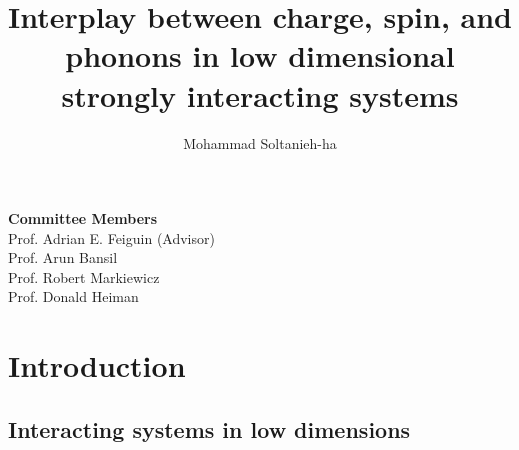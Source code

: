 \documentclass[article,11pt]{revtex4}
\begin{document}
\title{Interplay between charge, spin, and phonons in low dimensional strongly interacting systems}
\author{Mohammad Soltanieh-ha}
\vspace*{-.75in}
\maketitle
\vspace*{-.3in}
\hspace*{.in}
\textbf{Committee Members} \\
\hspace*{0.5in}Prof. Adrian E. Feiguin (Advisor)\\%
\hspace*{0.5in}Prof. Arun Bansil  \hspace*{.24in}    \\
\hspace*{0.5in}Prof. Robert Markiewicz\\%
\hspace*{0.5in}Prof. Donald Heiman
\vspace*{-.5in}
\tableofcontents

\section{Introduction}

\subsection {Interacting systems in low dimensions}

\end{document}
